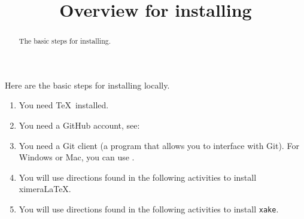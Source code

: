 \documentclass{ximera}
\title{Overview for installing}
\begin{document}
\begin{abstract}
  The basic steps for installing.
\end{abstract}
\maketitle

Here are the basic steps for installing locally.

\begin{enumerate}
\item You need \TeX\ installed.
\item You need a GitHub account, see: 
\item You need a Git client (a program that allows you to interface
  with Git). For Windows or Mac, you can use .
\item You will use directions found in the following activities to
  install ximera\LaTeX.
\item You will use directions found in the following activities to
  install \verb|xake|.
\end{enumerate}
\end{document}
